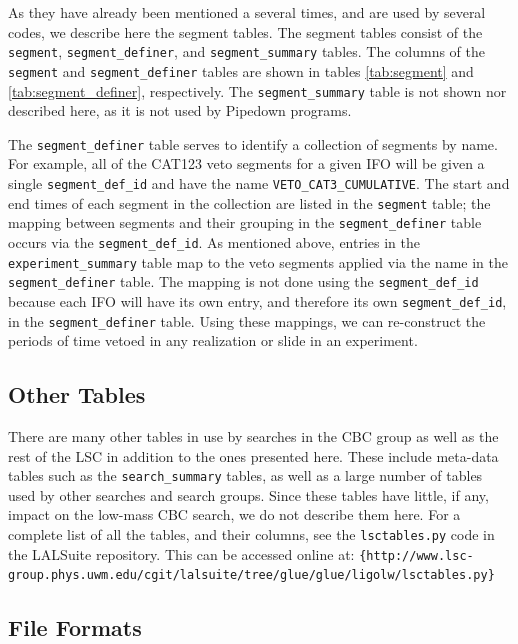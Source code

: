 As they have already been mentioned a several times, and are used by several codes, we describe here the segment tables. The segment tables consist of the \texttt{segment}, \texttt{segment\_definer}, and \texttt{segment\_summary} tables. The columns of the \texttt{segment} and \texttt{segment\_definer} tables are shown in tables \ref{tab:segment} and \ref{tab:segment_definer}, respectively. The \texttt{segment\_summary} table is not shown nor described here, as it is not used by Pipedown programs.

The \texttt{segment\_definer} table serves to identify a collection of segments by name. For example, all of the CAT123 veto segments for a given \ac{IFO} will be given a single \texttt{segment\_def\_id} and have the name \texttt{VETO\_CAT3\_CUMULATIVE}. The start and end times of each segment in the collection are listed in the \texttt{segment} table; the mapping between segments and their grouping in the \texttt{segment\_definer} table occurs via the \texttt{segment\_def\_id}. As mentioned above, entries in the \texttt{experiment\_summary} table map to the veto segments applied via the name in the \texttt{segment\_definer} table. The mapping is not done using the \texttt{segment\_def\_id} because each \ac{IFO} will have its own entry, and therefore its own \texttt{segment\_def\_id}, in the \texttt{segment\_definer} table. Using these mappings, we can re-construct the periods of time vetoed in any realization or slide in an experiment.

\subsection{Other Tables}

There are many other tables in use by searches in the \ac{CBC} group as well as the rest of the \ac{LSC} in addition to the ones presented here. These include meta-data tables such as the \texttt{search\_summary} tables, as well as a large number of tables used by other searches and search groups. Since these tables have little, if any, impact on the low-mass \ac{CBC} search, we do not describe them here. For a complete list of all the tables, and their columns, see the \texttt{lsctables.py} code in the LALSuite repository. This can be accessed online at: \verb|{http://www.lsc-group.phys.uwm.edu/cgit/lalsuite/tree/glue/glue/ligolw/lsctables.py}|

\subsection{File Formats}

